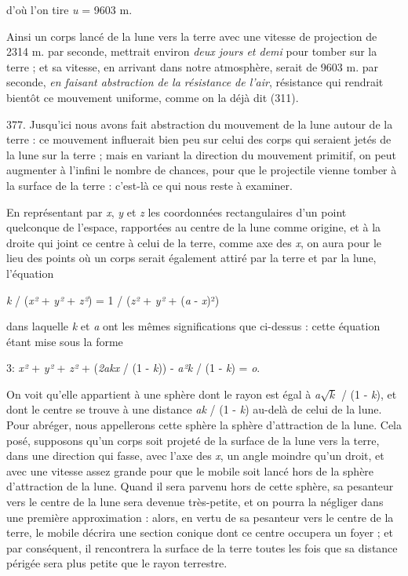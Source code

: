 \documentclass[a4paper, 11pt, oneside, polutonikogreek, french]{article}
\begin{document}
d'où l'on tire \emph{u} = 9603 m.

Ainsi un corps lancé de la lune vers la terre avec une vitesse de projection de 2314 m. par seconde, mettrait environ \emph{deux jours et demi} pour tomber sur la terre ; et sa vitesse, en arrivant dans notre atmosphère, serait de 9603 m. par seconde, \emph{en faisant abstraction de la résistance de l'air}, résistance qui rendrait bientôt ce mouvement uniforme, comme on la déjà dit (311).

377. Jusqu'ici nous avons fait abstraction du mouvement de la lune autour de la terre : ce mouvement influerait bien peu sur celui des corps qui seraient jetés de la lune sur la terre ; mais en variant la direction du mouvement primitif, on peut augmenter à l'infini le nombre de chances, pour que le projectile vienne tomber à la surface de la terre : c'est-là ce qui nous reste à examiner.

En représentant par \emph{x}, \emph{y} et \emph{z} les coordonnées rectangulaires d'un point quelconque de l'espace, rapportées au centre de la lune comme origine, et à la droite qui joint ce centre à celui de la terre, comme axe des \emph{x}, on aura pour le lieu des points où un corps serait également attiré par la terre et par la lune, l'équation

\begin{center}
\emph{k} / (\emph{x²} + \emph{y²} + \emph{z²}) = 1 / (\emph{z²} + \emph{y²} + (\emph{a} - \emph{x})²)
\end{center}

dans laquelle \emph{k} et \emph{a} ont les mêmes significations que ci-dessus : cette équation étant mise sous la forme

\begin{center}
3: \emph{x²} + \emph{y²} + \emph{z²} + (\emph{2akx} / (1 - \emph{k})) -  \emph{a²k} / (1 - \emph{k}) = \emph{o}.
\end{center}

On voit qu’elle appartient à une sphère dont le rayon est égal à \emph{a}$\sqrt{k}$ / (1 - \emph{k}), et dont le centre se trouve à une distance \emph{ak} / (1 - \emph{k}) au-delà de celui de la lune. Pour abréger, nous appellerons cette sphère la sphère d'attraction de la lune. Cela posé, supposons qu'un corps soit projeté de la surface de la lune vers la terre, dans une direction qui fasse, avec l'axe des \emph{x}, un angle moindre qu'un droit, et avec une vitesse assez grande pour que le mobile soit lancé hors de la sphère d'attraction de la lune. Quand il sera parvenu hors de cette sphère, sa pesanteur vers le centre de la lune sera devenue très-petite, et on pourra la négliger dans une première approximation : alors, en vertu de sa pesanteur vers le centre de la terre, le mobile décrira une section conique dont ce centre occupera un foyer ; et par conséquent, il rencontrera la surface de la terre toutes les fois que sa distance périgée sera plus petite que le rayon terrestre.
\end{document}
